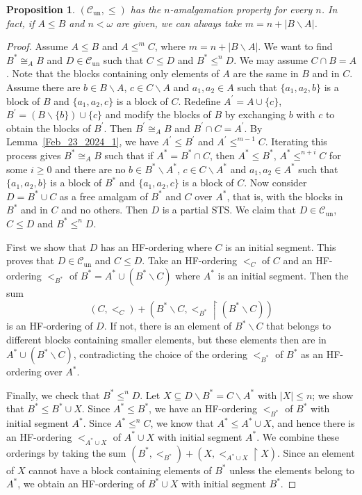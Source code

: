 \documentclass[a4paper, 11pt]{article}
\newcommand{\Cun}{\mathcal{C}_\mathrm{un}}
\theoremstyle{note}
\newtheorem{prop}[thm]{Proposition}
\begin{document}
	
	\begin{prop}\label{Feb_23_2024_2} $(\Cun,\leq)$ has the $n$-amalgamation property for every $n$.  In fact, if $A\leq B$ and $n<\omega$ are given, we can always take $m= n+|B\smallsetminus A|$.
	\end{prop}
	\begin{proof} Assume $A\leq B$  and  $A\leq^m C$, where $m= n+|B\smallsetminus A|$. We want to find $B^\ast\cong_A B$ and $D\in \Cun$  such that  $C\leq D$ and $B^\ast\leq^n D$.  We may assume $C\cap B=A$. Note that the blocks containing only elements of $A$ are the same in $B$ and in $C$.  Assume there are $b\in B\smallsetminus A$, $c\in C\smallsetminus A$ and  $a_1,a_2\in A$  such that $\{a_1,a_2,b\}$ is a block of $B$ and  $\{a_1,a_2,c\}$ is a block of $C$. Redefine $A^\prime= A\cup\{c\}$,  $B^\prime = (B\smallsetminus \{b\})\cup \{c\}$ and modify the blocks of $B$ by exchanging $b$ with $c$  to obtain the blocks of $B^\prime$. Then $B^\prime\cong_A B$ and $B^\prime\cap C=A^\prime$.  By Lemma~\ref{Feb_23_2024_1}, we have  $A^\prime\leq B^\prime$ and $A^\prime\leq^{m-1} C$. Iterating this process gives $B^\ast\cong_A B$  such that if $A^\ast =B^\ast \cap C$, then   $A^\ast \leq B^\ast$,  $A^\ast\leq^{n +i}C$  for some $i \geq 0$  and there are no $b\in B^\ast\smallsetminus A^\ast$, $c\in C\smallsetminus A^\ast$ and $a_1,a_2\in A^\ast$ such that  $\{a_1,a_2,b\}$ is a block of $B^\ast$  and  $\{a_1,a_2,c\}$ is a block of $C$.  Now consider $D=B^\ast\cup C$ as a free amalgam of $B^\ast$ and $C$ over $A^\ast$, that is,  with the blocks in $B^\ast$ and in $C$ and no others.  Then $D$ is a partial STS. We claim that $D\in \Cun$, $C\leq D$ and $B^\ast\leq^n D$.
		
First we show that $D$ has an HF-ordering where $C$ is an initial segment. This proves that $D\in\Cun$ and $C\leq D$.  Take an HF-ordering $<_C$ of $C$ and an HF-ordering $<_{B^\ast}$ of  $B^\ast=A^\ast\cup (B^\ast\smallsetminus C)$ where $A^\ast$ is an initial segment. Then the sum 
$$(C,<_C)+(B^\ast\smallsetminus C,<_{B^\ast}\restriction (B^\ast\smallsetminus C))$$ 
is an HF-ordering of $D$. If not, there is an element of $B^\ast\smallsetminus C$ that belongs to different blocks containing smaller elements, but these elements then are in $A^\ast\cup (B^\ast\smallsetminus C)$, contradicting the choice of the ordering $<_{B^\ast}$ of $B^\ast$ as an HF-ordering over $A^\ast$.
		
		Finally, we check that $B^\ast\leq^n D$.  Let $X\subseteq D\smallsetminus B^\ast = C\smallsetminus A^\ast$  with $|X|\leq n$; we show that $B^\ast\leq B^\ast \cup X$.  Since  $A^\ast\leq B^\ast$, we have an HF-ordering $<_{B^\ast}$ of $B^\ast$ with initial segment $A^\ast$.  Since $A^\ast\leq^n C$, we know that $A^\ast\leq A^\ast\cup X$, and hence there is an HF-ordering $<_{A^\ast \cup X}$ of $A^\ast\cup  X$ with initial segment $A^\ast$. We combine these orderings by taking the sum $(B^\ast,<_{B^\ast})+(X,<_{A^\ast\cup X}\restriction X)$. Since an element of $X$ cannot have a block containing elements of $B^\ast$ unless the elements belong to $A^\ast$, we obtain an HF-ordering of $B^\ast\cup X$ with initial segment $B^\ast$.
	\end{proof}
	
\end{document}

